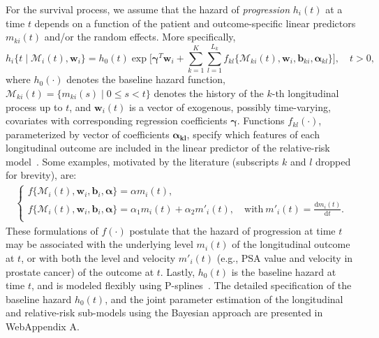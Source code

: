 For the survival process, we assume that the hazard of \textit{progression} $h_i(t)$ at a time $t$ depends on a function of the patient and outcome-specific linear predictors $m_{ki}(t)$ and/or the random effects. More specifically,
\begin{equation}
\label{eq:rel_risk_model}
h_i\big\{t \mid \mathcal{M}_i(t), \boldsymbol{w}_i\big\} = h_0(t) \exp\Big[\boldsymbol{\gamma}^T\boldsymbol{w}_i + \sum_{k=1}^{K} \sum_{l=1}^{L_k} f_{kl} \big\{ \mathcal{M}_{ki}(t), \boldsymbol{w}_i, \boldsymbol{b}_{ki}, \boldsymbol{\alpha}_{kl} \big\}\Big], \quad t>0,
\end{equation}
where $h_0(\cdot)$ denotes the baseline hazard function, $\mathcal{M}_{ki}(t)=\{m_{ki}(s) \mid 0 \leq s < t \}$ denotes the history of the ${k\mbox{-th}}$ longitudinal process up to $t$, and $\boldsymbol{w}_i(t)$ is a vector of exogenous, possibly time-varying, covariates with corresponding regression coefficients $\boldsymbol{\gamma}$. Functions $f_{kl}(\cdot)$, parameterized by vector of coefficients $\boldsymbol{\alpha_{kl}}$, specify which features of each longitudinal outcome are included in the linear predictor of the relative-risk model~\citep{brown2009assessing,rizopoulos2012joint,taylor2013real}. Some examples, motivated by the literature (subscripts $k$ and $l$ dropped for brevity), are:
\begin{eqnarray*}
\left \{
\begin{array}{l}
f\big\{\mathcal{M}_{i}(t), \boldsymbol{w}_i, \boldsymbol{b}_{i}, \boldsymbol{\alpha} \big\} = \alpha m_{i}(t),\\
f\big\{ \mathcal{M}_{i}(t), \boldsymbol{w}_i, \boldsymbol{b}_{i}, \boldsymbol{\alpha}\big\} = \alpha_1 m_{i}(t) + \alpha_2 m'_{i}(t),\quad \text{with}\  m'_{i}(t) = \frac{\mathrm{d}{m_{i}(t)}}{\mathrm{d}{t}}.\\
\end{array}
\right.
\end{eqnarray*}
These formulations of $f(\cdot)$ postulate that the hazard of progression at time $t$ may be associated with the underlying level $m_i(t)$ of the longitudinal outcome at $t$, or with both the level and velocity $m'_i(t)$ (e.g., PSA value and velocity in prostate cancer) of the outcome at $t$. Lastly, $h_0(t)$ is the baseline hazard at time $t$, and is modeled flexibly using P-splines~\citep{eilers1996flexible}. The detailed specification of the baseline hazard $h_0(t)$, and the joint parameter estimation of the longitudinal and relative-risk sub-models using the Bayesian approach are presented in WebAppendix A.
